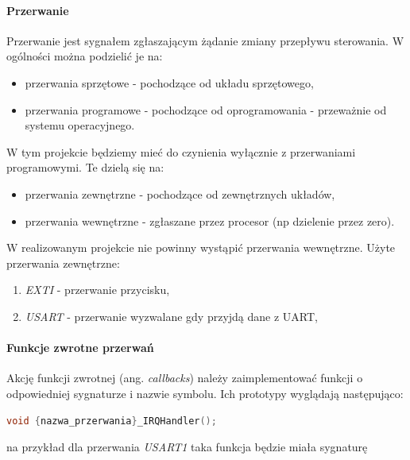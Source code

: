 \documentclass{article}
\begin{document}
\paragraph{Przerwanie}
Przerwanie jest sygnałem zgłaszającym żądanie zmiany przepływu sterowania.
W ogólności można podzielić je na:

\begin{itemize}
    \item przerwania sprzętowe - pochodzące od układu sprzętowego,
    \item przerwania programowe - pochodzące od oprogramowania - przeważnie od
            systemu operacyjnego.
\end{itemize}

W tym projekcie będziemy mieć do czynienia wyłącznie z przerwaniami programowymi.
Te dzielą się na:

\begin{itemize}
    \item przerwania zewnętrzne - pochodzące od zewnętrznych układów,
    \item przerwania wewnętrzne - zgłaszane przez procesor (np dzielenie przez zero).
\end{itemize}

W realizowanym projekcie nie powinny wystąpić przerwania wewnętrzne.
Użyte przerwania zewnętrzne:

\begin{enumerate}
    \item \emph{EXTI} - przerwanie przycisku,
    \item \emph{USART} - przerwanie wyzwalane gdy przyjdą dane z UART,
\end{enumerate}

\paragraph{Funkcje zwrotne przerwań}
Akcję funkcji zwrotnej (ang. \emph{callbacks}) należy zaimplementować funkcji
o odpowiedniej sygnaturze i nazwie symbolu. Ich prototypy wyglądają następująco:

\begin{center}
\begin{lstlisting}[language=C, basicstyle=\footnotesize]
void {nazwa_przerwania}_IRQHandler();
\end{lstlisting}
\end{center}

na przykład dla przerwania \emph{USART1} taka funkcja będzie miała sygnaturę
\end{document}
